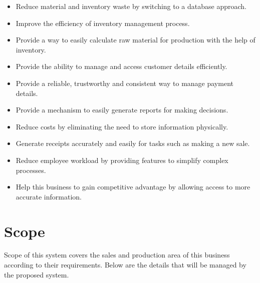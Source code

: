 \documentclass[12pt]{report}
\begin{document}
\begin{itemize}
	\item Reduce material and inventory waste by switching to a database approach.

	\item Improve the efficiency of inventory management process.

	\item Provide a way to easily calculate raw material for production with the help of inventory.

	\item Provide the ability to manage and access customer details efficiently.

	\item Provide a reliable,  trustworthy and consistent way to manage payment details.

	\item Provide a mechanism to easily generate reports for making decisions.

	\item Reduce costs by eliminating the need to store information physically.

	\item Generate receipts accurately and easily for tasks such as making a new sale.

	\item Reduce employee workload by providing features to simplify complex processes.

	\item Help this business to gain competitive advantage by allowing access to more accurate information.
\end{itemize}

\section{Scope}
Scope of this system covers the sales and production area of this business according to their requirements. Below are the details that will be managed by the proposed system.
\end{document}
